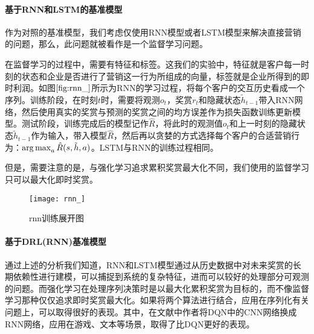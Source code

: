 



 \paragraph{基于RNN和LSTM的基准模型}
 作为对照的基准模型，我们考虑仅使用RNN模型或者LSTM模型来解决直接营销的问题，那么，此问题就被看作是一个监督学习问题。

 在监督学习的过程中，需要有特征和标签。这我们的实验中，特征就是客户每一时刻的状态和企业是否进行了营销这一行为所组成的向量，标签就是企业所得到的即时利润。如图$\ref{fig:rnn_}$所示为RNN的学习过程，将每个客户的交互历史看成一个序列。训练阶段，在时刻$t$时，需要将观测$o_{t}$，奖赏$r_{t}$和隐藏状态$\tilde{h}_{t-1}$带入RNN网络，然后使用真实的奖赏与预测的奖赏之间的均方误差作为损失函数训练更新模型。测试阶段，训练完成后的模型记作$\hat{R}$，将此时的观测值$o_{t}$和上一时刻的隐藏状态$\tilde{h}_{t-1}$作为输入，带入模型$\hat{R}$，然后再以贪婪的方式选择每个客户的合适营销行为：$\operatorname*{arg\,max}_{a}\hat{R}(s,\tilde{h},a)$。LSTM与RNN的训练过程相同。

 但是，需要注意的是，与强化学习追求累积奖赏最大化不同，我们使用的监督学习只可以最大化即时奖赏。

\begin{figure}[htbp]
\centering
\texttt{[image: rnn\_]}
\caption{rnn训练展开图}
\label{fig:rnn_}
\end{figure}

\paragraph{基于DRL(RNN)基准模型}
通过上述的分析我们知道，RNN和LSTM模型通过从历史数据中对未来奖赏的长期依赖性进行建模，可以捕捉到系统的复杂特征，进而可以较好的处理部分可观测的问题。而强化学习在处理序列决策时是以最大化累积奖赏为目标的，而不像监督学习那种仅仅追求即时奖赏最大化。如果将两个算法进行结合\citep{bakker2002reinforcement,hausknecht2015deep,lin1993reinforcement,narasimhan2015language}，应用在序列化有关问题上，可以取得很好的表现。其中，在文献\citep{hausknecht2015deep,narasimhan2015language}中作者将DQN中的CNN网络换成RNN网络，应用在游戏、文本等场景，取得了比DQN更好的表现。

